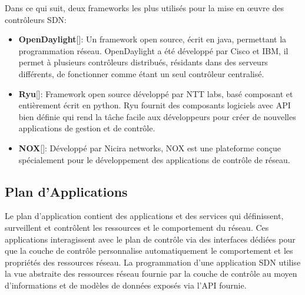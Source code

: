\noindent Dans ce qui suit, deux frameworks les plus utilisés pour la mise en œuvre des contrôleurs SDN:\\
\begin{itemize}
\item[]\textbf{OpenDaylight}[\cite{3}]: Un framework open source, écrit en java, permettant la programmation réseau. OpenDaylight a été développé par Cisco et IBM, il permet à plusieurs contrôleurs distribués, résidants dans des serveurs différents, de fonctionner comme étant un seul contrôleur centralisé.\\
\item[]\textbf{Ryu}[\cite{4}]: Framework open source développé par NTT labs, basé composant et entièrement écrit en python. Ryu fournit des composants logiciels avec API bien définie qui rend la tâche facile aux développeurs pour créer de nouvelles applications de gestion et de contrôle.\\
\item[]\textbf{NOX}[\cite{5}]: Développé par Nicira networks, NOX est une plateforme conçue spécialement pour le développement des applications de contrôle de réseau.
\end{itemize} 

\newpage
\subsection{Plan d'Applications}
Le plan d’application contient des applications et des services qui définissent, surveillent et contrôlent les ressources et le comportement du réseau. Ces applications interagissent avec le plan de contrôle via des interfaces dédiées pour que la couche de contrôle personnalise automatiquement le comportement et les propriétés des ressources réseau. La programmation d’une application SDN utilise la vue abstraite des ressources réseau fournie par la couche de contrôle au moyen d’informations et de modèles de données exposés via l’API fournie.

